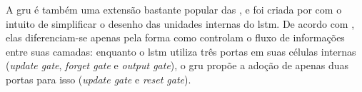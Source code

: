 


A \acrshort{gru} é também uma extensão bastante popular das , e foi criada por  com o intuito de simplificar o desenho das unidades internas do \acrshort{lstm}. 
De acordo com , elas diferenciam-se apenas pela forma como controlam o fluxo de informações entre suas camadas: enquanto o \acrshort{lstm} utiliza três portas em suas células internas (\textit{update gate}, \textit{forget gate} e \textit{output gate}), o \acrshort{gru} propõe a adoção de apenas duas portas para isso (\textit{update gate} e \textit{reset gate}).


